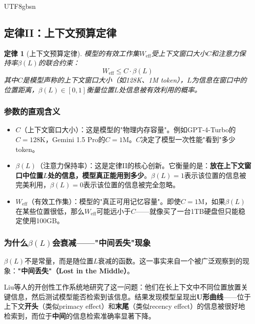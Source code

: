 \documentclass[11pt,a4paper]{article}
\newtheorem{law}{定律}[section]
\begin{document}
\begin{CJK*}{UTF8}{gbsn}
\subsection{定律II：上下文预算定律}
\label{sec:law2}

\begin{law}[上下文预算定律]
模型的有效工作集$W_{\mathrm{eff}}$受上下文窗口大小$C$和注意力保持率$\beta(L)$的联合约束：
\begin{equation}
\label{eq:context}
W_{\mathrm{eff}} \leq C \cdot \beta(L)
\end{equation}
其中$C$是模型声称的上下文窗口大小（如128K、1M token），$L$为信息在窗口中的位置距离，$\beta(L) \in [0,1]$衡量位置$L$处信息被有效利用的概率。
\end{law}

\subsubsection{参数的直观含义}

\begin{itemize}[nosep]
\item $C$（上下文窗口大小）：这是模型的"物理内存容量"。例如GPT-4-Turbo的$C = 128\mathrm{K}$，Gemini 1.5 Pro的$C = 1\mathrm{M}$。$C$决定了模型一次性能"看到"多少token。
\item $\beta(L)$（注意力保持率）：这是定律II的核心创新。它衡量的是：\textbf{放在上下文窗口中位置$L$处的信息，模型真正能用到多少}。$\beta(L) = 1$表示该位置的信息被完美利用，$\beta(L) = 0$表示该位置的信息被完全忽略。
\item $W_{\mathrm{eff}}$（有效工作集）：模型的"真正可用记忆容量"。即使$C = 1\mathrm{M}$，如果$\beta(L)$在某些位置很低，那么$W_{\mathrm{eff}}$可能远小于$C$——就像买了一台1TB硬盘但只能稳定使用100GB。
\end{itemize}

\subsubsection{为什么$\beta(L)$会衰减——"中间丢失"现象}

$\beta(L)$不是常量，而是随位置$L$衰减的函数。这一事实来自一个被广泛观察到的现象：\textbf{"中间丢失"（Lost in the Middle）}。

Liu等人的开创性工作系统地研究了这一问题\cite{liu2023lostmiddle}：他们在长上下文中不同位置放置关键信息，然后测试模型能否检索到该信息。结果发现模型呈现出\textbf{U形曲线}——位于上下文\textbf{开头}（类似primacy effect）和\textbf{末尾}（类似recency effect）的信息被很好地检索到，而位于\textbf{中间}的信息检索准确率显著下降。


\end{CJK*}
\end{document}
